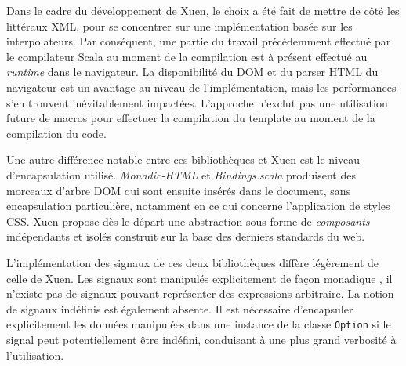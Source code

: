 Dans le cadre du développement de Xuen, le choix a été fait de mettre de côté les littéraux XML, pour se concentrer sur une implémentation basée sur les interpolateurs. Par conséquent, une partie du travail précédemment effectué par le compilateur Scala au moment de la compilation est à présent effectué au \emph{runtime} dans le navigateur. La disponibilité du DOM et du parser HTML du navigateur est un avantage au niveau de l'implémentation, mais les performances s'en trouvent inévitablement impactées. L'approche n'exclut pas une utilisation future de macros pour effectuer la compilation du template au moment de la compilation du code.

Une autre différence notable entre ces bibliothèques et Xuen est le niveau d'encapsulation utilisé.  \emph{Monadic-HTML} et \emph{Bindings.scala} produisent des morceaux d'arbre DOM qui sont ensuite insérés dans le document, sans encapsulation particulière, notamment en ce qui concerne l'application de styles CSS. Xuen propose dès le départ une abstraction sous forme de \emph{composants} indépendants et isolés construit sur la base des derniers standards du web.

L'implémentation des signaux de ces deux bibliothèques diffère légèrement de celle de Xuen. Les signaux sont manipulés explicitement de façon monadique , il n'existe pas de signaux pouvant représenter des expressions arbitraire. La notion de signaux indéfinis est également absente. Il est nécessaire d'encapsuler explicitement les données manipulées dans une instance de la classe \texttt{Option} si le signal peut potentiellement être indéfini, conduisant à une plus grand verbosité à l'utilisation.